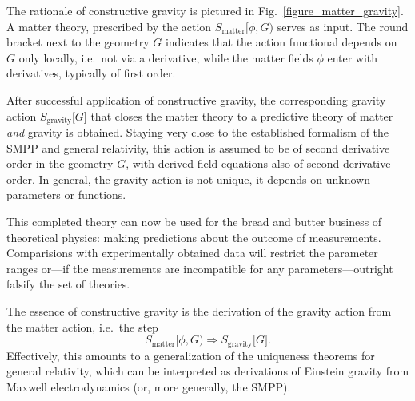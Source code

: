 The rationale of constructive gravity is pictured in Fig.~\ref{figure_matter_gravity}. A matter theory, prescribed by the action $S_\text{matter}\lbrack\phi,G)$ serves as input. The round bracket next to the geometry $G$ indicates that the action functional depends on $G$ only locally, i.e.\ not via a derivative, while the matter fields $\phi$ enter with derivatives, typically of first order.

After successful application of constructive gravity, the corresponding gravity action $S_\text{gravity}\lbrack G\rbrack$ that closes the matter theory to a predictive theory of matter \emph{and} gravity is obtained. Staying very close to the established formalism of the SMPP and general relativity, this action is assumed to be of second derivative order in the geometry $G$, with derived field equations also of second derivative order. In general, the gravity action is not unique, it depends on unknown parameters or functions.

This completed theory can now be used for the bread and butter business of theoretical physics: making predictions about the outcome of measurements. Comparisions with experimentally obtained data will restrict the parameter ranges or---if the measurements are incompatible for any parameters---outright falsify the set of theories.

The essence of constructive gravity is the derivation of the gravity action from the matter action, i.e.\ the step
\begin{equation*}
  S_\text{matter}\lbrack\phi,G) \Rightarrow S_\text{gravity}\lbrack G\rbrack.
\end{equation*}
Effectively, this amounts to a generalization of the uniqueness theorems for general relativity, which can be interpreted as derivations of Einstein gravity from Maxwell electrodynamics (or, more generally, the SMPP).

